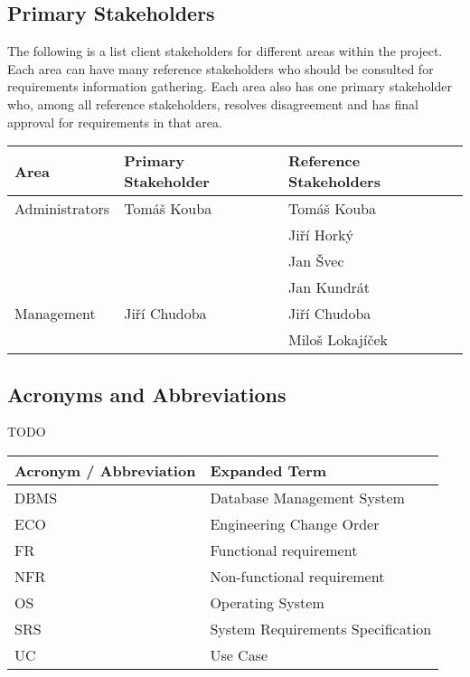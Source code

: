 \documentclass[12pt]{article}
\begin{document}
\subsection{Primary Stakeholders}
The following is a list client stakeholders for different areas within the project. Each area can have many reference stakeholders 
who should be consulted for requirements information gathering. Each area also has one primary stakeholder who, among all reference 
stakeholders, resolves disagreement and has final approval for requirements in that area.

\begin{table}[!h]
	\begin{tabular}{| l | l | l |}
		\hline
		\textbf{Area}		& \textbf{Primary Stakeholder} & \textbf{Reference Stakeholders}\\
        \hline
        Administrators	& Tomáš Kouba           & Tomáš Kouba\\
                          & & Jiří Horký\\
                          & & Jan Švec\\
                          & & Jan Kundrát\\
        \hline
        Management	& Jiří Chudoba           & Jiří Chudoba\\
                          & & Miloš Lokajíček\\
        \hline
	\end{tabular}
	\label{tab:PrimaryStakeholders}
\end{table}

\subsection{Acronyms and Abbreviations}

TODO

\begin{table}[!h]
	\begin{tabular}{| l | l |}
		\hline
		\textbf{Acronym / Abbreviation}		& \textbf{Expanded Term}\\
		\hline
		DBMS	& Database Management System\\
		\hline
		ECO		&	Engineering Change Order\\
		\hline
		FR		&	Functional requirement\\
		\hline
		NFR		&	Non-functional requirement\\
		\hline
		OS		& Operating System\\
		\hline
		SRS		& System Requirements Specification\\
		\hline
		UC		&	Use Case\\
		\hline
	\end{tabular}
	\label{tab:AcronymsAndAbbreviations}
\end{table}
\end{document}
